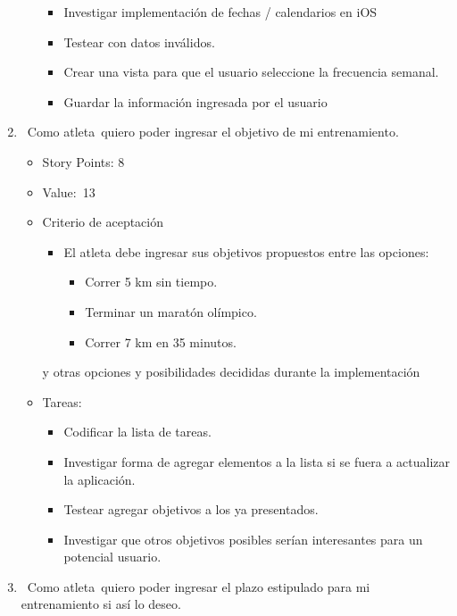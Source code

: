 \begin{enumerate}
\begin{itemize}
    \begin{itemize}
    \item
      Investigar implementación de fechas / calendarios en iOS
    \item
      Testear con datos inválidos.
    \item
      Crear una vista para que el usuario seleccione la frecuencia
      semanal.
    \item
      Guardar la información ingresada por el usuario
    \end{itemize}
  \end{itemize}
\item
  ~Como atleta~quiero poder ingresar el objetivo de mi entrenamiento.

  \begin{itemize}
  \item
    Story Points: 8
  \item
    Value:~13
  \item
    Criterio de aceptación

    \begin{itemize}
    \item
      El atleta debe ingresar sus objetivos propuestos entre las
      opciones:

      \begin{itemize}
      \item
        Correr 5 km sin tiempo.
      \item
        Terminar un maratón olímpico.
      \item
        Correr 7 km en 35 minutos.
      \end{itemize}
    \end{itemize}

    y otras opciones y posibilidades decididas durante la implementación
  \item
    Tareas:

    \begin{itemize}
    \item
      Codificar la lista de tareas.
    \item
      Investigar forma de agregar elementos a la lista si se fuera a
      actualizar la aplicación.
    \item
      Testear agregar objetivos a los ya presentados.
    \item
      Investigar que otros objetivos posibles serían interesantes para
      un potencial usuario.
    \end{itemize}
  \end{itemize}
\item
  ~Como atleta~quiero poder ingresar el plazo estipulado para mi
  entrenamiento si así lo deseo.


\end{enumerate}
